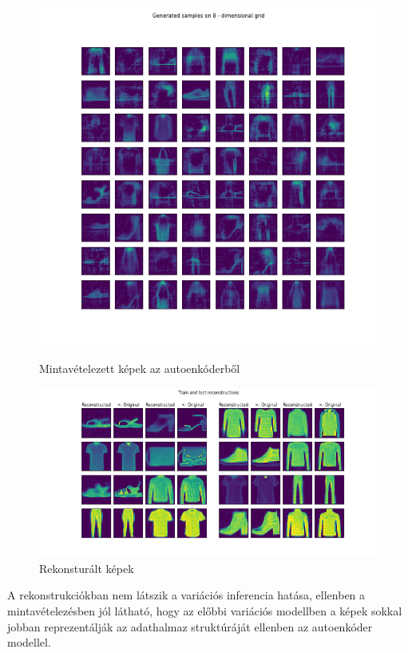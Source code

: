 \documentclass[12pt, english]{article}
\begin{document}
\begin{figure}[H] 
  \label{fig:auto_encoder_results} 
  \begin{minipage}{0.5\linewidth}
    \centering
    \includegraphics[width=.65\linewidth]{gen/generated_samples_fashion_mnist_auto_encoder.png} 
    \caption{Mintavételezett képek az autoenkóderből} 
  \end{minipage}%
  \begin{minipage}{0.5\linewidth}
    \centering
    \includegraphics[width=.95\linewidth]{reco/reconstrunction_samples_fashion_mnist_auto_encoder.png} 
    \caption{Rekonsturált képek} 
  \end{minipage} 
\end{figure}

\vspace{4mm}

\par A rekonstrukciókban nem látszik a variációs inferencia hatása, ellenben a mintavételezésben jól látható, hogy az előbbi variációs modellben a képek sokkal jobban reprezentálják az adathalmaz struktúráját ellenben az autoenkóder modellel.
\end{document}
